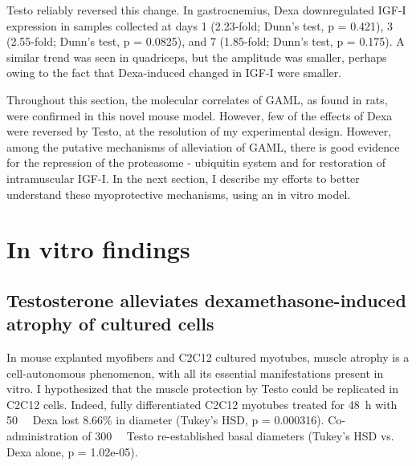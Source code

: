 \documentclass[12pt,english]{report}\usepackage[]{graphicx}\usepackage[]{color}
\begin{document}
Testo reliably reversed this change. In gastrocnemius, Dexa downregulated
IGF-I expression in samples collected at days 1 (2.23-fold;
Dunn's test, p = 0.421),
3 (2.55-fold;
Dunn's test, p = 0.0825),
and 7 (1.85-fold;
Dunn's test, p = 0.175).
A similar trend was seen in quadriceps, but the amplitude was smaller,
perhaps owing to the fact that Dexa-induced changed in IGF-I were
smaller.

Throughout this section, the molecular correlates of GAML, as found
in rats, were confirmed in this novel mouse model. However, few of
the effects of Dexa were reversed by Testo, at the resolution of my
experimental design. However, among the putative mechanisms of alleviation
of GAML, there is good evidence for the repression of the proteasome
- ubiquitin system and for restoration of intramuscular IGF-I. In
the next section, I describe my efforts to better understand these
myoprotective mechanisms, using an in vitro model. \pagebreak{}


\chapter{In vitro findings}


\section{Testosterone alleviates dexamethasone-induced atrophy of cultured
cells}

In mouse explanted myofibers and C2C12 cultured myotubes, muscle atrophy
is a cell-autonomous phenomenon, with all its essential manifestations
present in vitro. I hypothesized that the muscle protection by Testo
could be replicated in C2C12 cells. Indeed, fully differentiated C2C12
myotubes treated for \SI{48}{\hour} with \SI{50}{\micro\molar} Dexa
lost 8.66\%
in diameter (Tukey's HSD, p = 0.000316).
Co-administration of \SI{300}{\nano\molar} Testo re-established basal
diameters (Tukey's HSD vs. Dexa alone, p = 1.02e-05).
\end{document}
